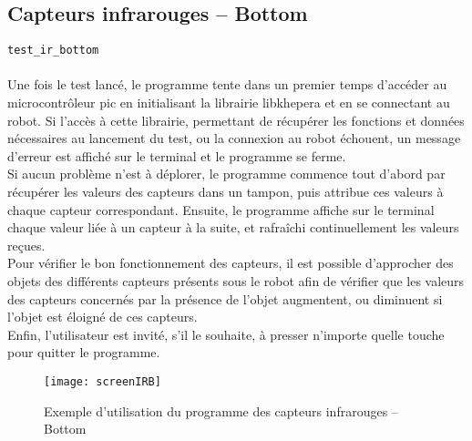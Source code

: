 \documentclass[11pt]{article} %
\begin{document}
\subsection{Capteurs infrarouges -- Bottom}
\verb|test_ir_bottom|\\
 \\
Une fois le test lancé, le programme tente dans un premier temps d’accéder au microcontrôleur pic en initialisant la librairie libkhepera et en se connectant au robot. Si l’accès à cette librairie, permettant de récupérer les fonctions et données nécessaires au lancement du test, ou la connexion au robot échouent, un message d’erreur est affiché sur le terminal et le programme se ferme.\\
Si aucun problème n’est à déplorer, le programme commence tout d’abord par récupérer les valeurs des capteurs dans un tampon, puis attribue ces valeurs à chaque capteur correspondant. Ensuite, le programme affiche sur le terminal chaque valeur liée à un capteur à la suite, et rafraîchi continuellement les valeurs reçues.\\
Pour vérifier le bon fonctionnement des capteurs, il est possible d’approcher des objets des différents capteurs présents sous le robot afin de vérifier que les valeurs des capteurs concernés par la présence de l’objet augmentent, ou diminuent si l’objet est éloigné de ces capteurs.\\
Enfin, l’utilisateur est invité, s’il le souhaite, à presser n’importe quelle touche pour quitter le programme.\\
\begin{figure}[H]
	\caption{Exemple d'utilisation du programme des capteurs infrarouges -- Bottom}
	\texttt{[image: screenIRB]}
\end{figure}
\end{document}
